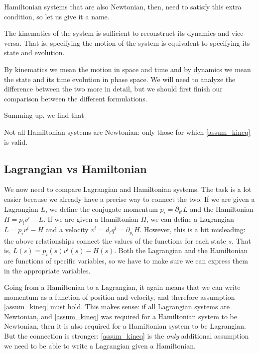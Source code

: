 Hamiltonian systems that are also Newtonian, then, need to satisfy this extra condition, so let us give it a name.
\renewcommand{\theassump}{KE}
\begin{assump}\label{assum_kineq}
	The kinematics of the system is sufficient to reconstruct its dynamics and vice-versa. That is, specifying the motion of the system is equivalent to specifying its state and evolution.
\end{assump}
\renewcommand{\theassump}{\Roman{assump}}
By kinematics we mean the motion in space and time and by dynamics we mean the state and its time evolution in phase space. We will need to analyze the difference between the two more in detail, but we should first finish our comparison between the different formulations.

Summing up, we find that
\begin{insight}
	Not all Hamiltonian systems are Newtonian: only those for which  \ref{assum_kineq} is valid.
\end{insight}

\subsection{Lagrangian vs Hamiltonian}

We now need to compare Lagrangian and Hamiltonian systems. The task is a lot easier because we already have a precise way to connect the two. If we are given a Lagrangian $L$, we define the conjugate momentum $p_i = \partial_{v^i} L$ and the Hamiltonian $H = p_i v^i - L$. If we are given a Hamiltonian $H$, we can define a Lagrangian $L = p_i v^i - H$ and a velocity $v^i = d_t q^i = \partial_{p_i} H$. However, this is a bit misleading: the above relationships connect the values of the functions for each state $s$. That is, $L(s) = p_i(s) v^i(s) - H(s)$. Both the Lagrangian and the Hamiltonian are functions of specific variables, so we have to make sure we can express them in the appropriate variables.

Going from a Hamiltonian to a Lagrangian, it again means that we can write momentum as a function of position and velocity, and therefore assumption \ref{assum_kineq} must hold. This makes sense: if all Lagrangian systems are Newtonian, and \ref{assum_kineq} was required for a Hamiltonian system to be Newtonian, then it is also required for a Hamiltonian system to be Lagrangian. But the connection is stronger: \ref{assum_kineq} is the \emph{only} additional assumption we need to be able to write a Lagrangian given a Hamiltonian.

